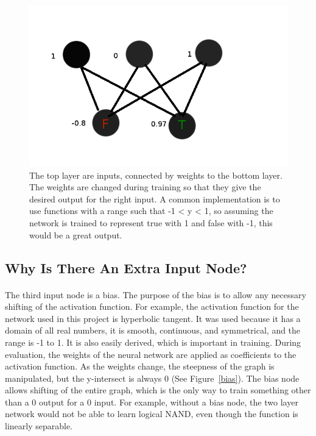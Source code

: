 \documentclass{article}
\begin{document}
    \begin{figure}
        \centering
        \includegraphics[scale=0.4]{images/perceptron.png}
        \caption{The top layer are inputs, connected by weights to the bottom 
            layer. The weights are changed during training so that they give the 
            desired output for the right input. A common implementation is to use 
            functions with a range such that -1 < y < 1, so assuming the network 
            is trained to represent true with 1 and false with -1, this would be 
            a great output.}
        \label{basicnetwork}
    \end{figure}

\subsection{Why Is There An Extra Input Node?}

    \paragraph{}The third input node is a bias. The purpose of the bias is 
    to allow any necessary shifting of the activation function. For example, the 
    activation function for the network used in this project is hyperbolic 
    tangent. It was used because it has a domain of all real numbers, it is smooth, 
    continuous, and symmetrical, and the range is -1 to 1. It is also easily 
    derived, which is important in training. During evaluation, the weights of the 
    neural network are applied as coefficients to the activation function. 
    As the weights change, the steepness of the graph is manipulated, but the 
    y-intersect is always 0 (See Figure~\ref{bias}). The bias node allows shifting
    of the entire graph, which is the only way to train something other than a 0 
    output for a 0 input. For example, without a bias node, the two layer network 
    would not be able to learn logical NAND, even though the function is linearly 
    separable.
\end{document}

